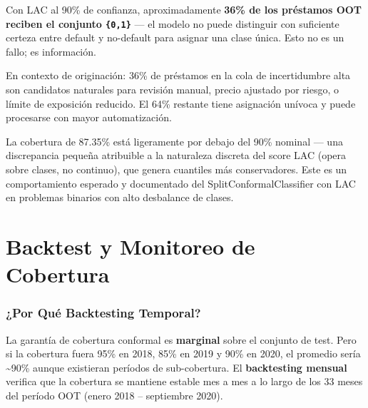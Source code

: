 \documentclass[
  spanish,
  11pt,
  letterpaper,
]{scrbook}
\theoremstyle{plain}
\theoremstyle{remark}
\begin{document}
\begin{tcolorbox}[enhanced jigsaw, arc=.35mm, bottomrule=.15mm, bottomtitle=1mm, breakable, colback=white, colbacktitle=quarto-callout-note-color!10!white, colframe=quarto-callout-note-color-frame, coltitle=black, left=2mm, leftrule=.75mm, opacityback=0, opacitybacktitle=0.6, rightrule=.15mm, title=\textcolor{quarto-callout-note-color}{\faInfo}\hspace{0.5em}{Interpretación del 36\% de conjuntos ambiguos}, titlerule=0mm, toprule=.15mm, toptitle=1mm]

Con LAC al 90\% de confianza, aproximadamente \textbf{36\% de los
préstamos OOT reciben el conjunto \texttt{\{0,1\}}} --- el modelo no
puede distinguir con suficiente certeza entre default y no-default para
asignar una clase única. Esto no es un fallo; es información.

En contexto de originación: 36\% de préstamos en la cola de
incertidumbre alta son candidatos naturales para revisión manual, precio
ajustado por riesgo, o límite de exposición reducido. El 64\% restante
tiene asignación unívoca y puede procesarse con mayor automatización.

La cobertura de 87.35\% está ligeramente por debajo del 90\% nominal ---
una discrepancia pequeña atribuible a la naturaleza discreta del score
LAC (opera sobre clases, no continuo), que genera cuantiles más
conservadores. Este es un comportamiento esperado y documentado del
SplitConformalClassifier con LAC en problemas binarios con alto
desbalance de clases.

\end{tcolorbox}

\chapter{Backtest y Monitoreo de
Cobertura}\label{sec-backtest-monitoring}

\subsection{¿Por Qué Backtesting
Temporal?}\label{por-quuxe9-backtesting-temporal}

La garantía de cobertura conformal es \textbf{marginal} sobre el
conjunto de test. Pero si la cobertura fuera 95\% en 2018, 85\% en 2019
y 90\% en 2020, el promedio sería \textasciitilde90\% aunque existieran
períodos de sub-cobertura. El \textbf{backtesting mensual} verifica que
la cobertura se mantiene estable mes a mes a lo largo de los 33 meses
del período OOT (enero 2018 -- septiembre 2020).
\end{document}
